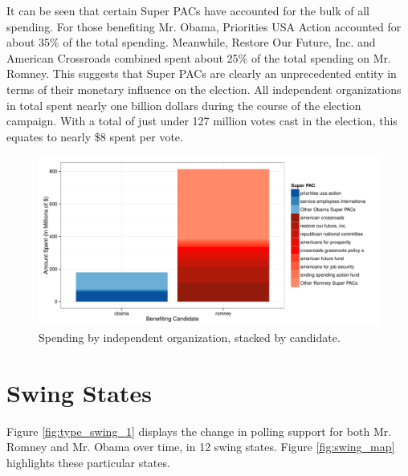 \documentclass[11pt]{article}\usepackage{graphicx, color}
\newenvironment{knitrout}{}{} %
\begin{document}
It can be seen that certain Super PACs have accounted for the bulk of all spending. For those benefiting Mr. Obama, Priorities USA Action accounted for about 35\% of the total spending. Meanwhile, Restore Our Future, Inc. and American Crossroads combined spent about 25\% of the total spending on Mr. Romney. This suggests that Super PACs are clearly an unprecedented entity in terms of their monetary influence on the election. All independent organizations in total spent nearly one billion dollars during the course of the election campaign. With a total of just under 127 million votes cast in the election, this equates to nearly \$8 spent per vote.

\begin{knitrout}
\color{fgcolor}\begin{figure}[H]


{\centering \includegraphics[width=\textwidth]{figure/PAC_plot} 

}

\caption[Spending by independent organization, stacked by candidate]{Spending by independent organization, stacked by candidate.\label{fig:PAC_plot}}
\end{figure}


\end{knitrout}




\section{Swing States}

Figure \ref{fig:type_swing_1} displays the change in polling support for both Mr. Romney and Mr. Obama over time, in 12 swing states. Figure \ref{fig:swing_map} highlights these particular states.
\end{document}
